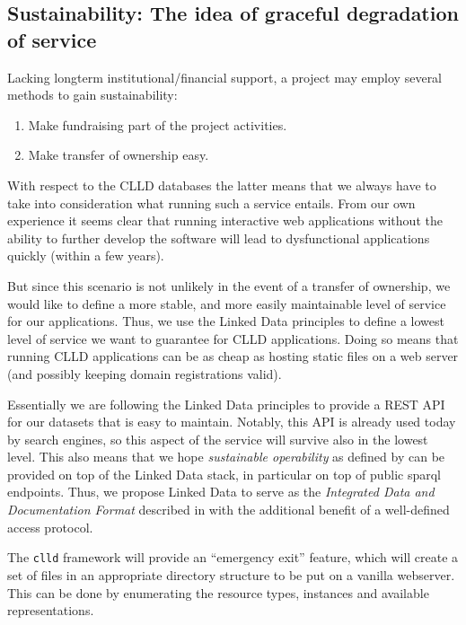 \documentclass[a4paper,10pt]{article}
\begin{document}
\subsection{Sustainability: The idea of graceful degradation of service}
\label{sec:sustainability}
Lacking longterm institutional/financial support, a project may employ several methods to gain sustainability:
\begin{enumerate}
\item Make fundraising part of the project activities.
\item Make transfer of ownership easy.
\end{enumerate}

With respect to the CLLD databases the latter means that we always have to take into consideration what running such a service
entails. From our own experience it seems clear that running interactive web applications without the ability to further develop 
the software will lead to dysfunctional applications quickly (within a few years).

But since this scenario is not unlikely in the event of a transfer of ownership, we would like to define a more stable, and more easily
maintainable level of service for our applications. Thus, we use the Linked Data principles to define a lowest level of service we
want to guarantee for CLLD applications. Doing so means that running CLLD applications can be as cheap as hosting static files on a
web server (and possibly keeping domain registrations valid).

Essentially we are following the Linked Data principles to provide a REST API for our datasets that is easy to maintain. Notably, this API is already used today by search engines, so this aspect of the service will survive also in the lowest level. This also means that we hope \emph{sustainable operability} as defined by  can be provided on top of the Linked Data stack, in particular on top of public sparql endpoints. Thus, we propose Linked Data to serve as the \emph{Integrated Data and Documentation Format} described in  with the additional benefit of a well-defined access protocol.

The \texttt{clld} framework will provide an ``emergency exit'' feature, which will create a set of files in an appropriate
directory structure to be put on a vanilla webserver. This can be done by enumerating the resource types, instances and
available representations.

\end{document}

